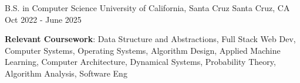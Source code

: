 \vspace{-2.0mm}
\begin{cventries}

  \cventry
    {B.S. in Computer Science} %
    {University of California, Santa Cruz} %
    {Santa Cruz, CA} %
    {Oct 2022 - June 2025} %
    {
      \begin{cvitems} %
        \item {\textbf{Relevant Coursework}: Data Structure and Abstractions, Full Stack Web Dev, Computer Systems, Operating Systems, Algorithm Design, Applied Machine Learning, Computer Architecture, Dynamical Systems, Probability Theory, Algorithm Analysis, Software Eng}
      \end{cvitems}
    }
\end{cventries}

